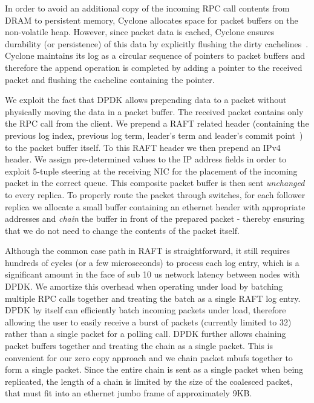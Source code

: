 \documentclass[letterpaper,twocolumn,10pt]{article}
\begin{document}
In order to avoid an additional copy of the incoming RPC call contents from DRAM
to persistent memory, Cyclone allocates space for packet buffers on the non-volatile
heap. However, since packet data is cached, Cyclone ensures durability
(or persistence) of this data by explicitly flushing the dirty
cachelines~\cite{pmfs}. Cyclone maintains its log as a circular sequence of
pointers to packet buffers and therefore the append operation is completed by
adding a pointer to the received packet and flushing the cacheline containing
the pointer.

We exploit the fact that DPDK allows prepending data to a packet
without physically moving the data in a packet buffer. The received packet
contains only the RPC call from the client. We prepend a RAFT related header
(containing the previous log index, previous log term, leader's term and
leader's commit point~\cite{raft}) to the packet buffer itself. To this RAFT header 
we then prepend an IPv4 header. We assign pre-determined values to the
IP address fields in order to exploit 5-tuple steering at the receiving NIC for 
the placement of the incoming packet in the correct queue.
This composite packet buffer is then sent \emph{unchanged} to every replica.
To properly route the packet through switches, for each follower replica we
allocate a small buffer containing an ethernet header with appropriate addresses
and \emph{chain} the buffer in front of the prepared packet - thereby ensuring
that we do not need to change the contents of the packet itself.

Although the common case path in RAFT is straightforward, it still requires
hundreds of cycles (or a few microseconds) to process each log entry, which is
a significant amount in the face of sub 10 us network latency between nodes with
DPDK. We amortize this overhead when operating under load by
batching multiple RPC calls together and treating the batch as a single RAFT log
entry.  DPDK by itself can efficiently batch incoming packets under load,
therefore allowing the user to easily receive a burst of packets
(currently limited to 32) rather than a single packet for a polling call.
DPDK further allows chaining packet
buffers together and treating the chain as a single packet. This is convenient
for our zero copy approach and we chain packet mbufs together to form a single
packet. Since the entire chain is sent as a single packet when being replicated,
the length of a chain is limited by the size of the coalesced packet, that must
fit into an ethernet jumbo frame of approximately 9KB.
\end{document}
